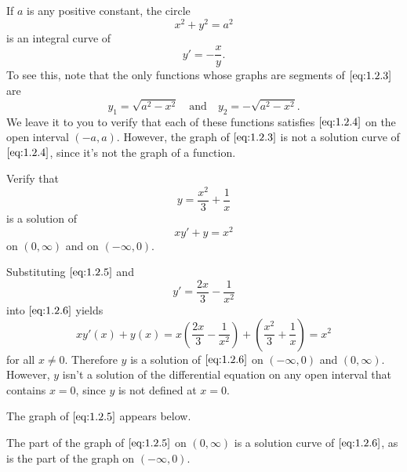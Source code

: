 \documentclass{ximera}
\begin{document}
\begin{example}
\label{example:1.2.1}
If $a$ is any positive constant,  the circle
\begin{equation} \label{eq:1.2.3}
x^2+y^2=a^2
\end{equation}
is an integral curve of
\begin{equation} \label{eq:1.2.4}
y'=-\frac{x}{y}.
\end{equation}
To see this, note that the only functions whose graphs are segments of
$\eqref{eq:1.2.3}$ are
$$
y_1=\sqrt{a^2-x^2}\quad\text{and}\quad y_2=-\sqrt{a^2-x^2}.
$$
We leave it to you to verify that each of these functions satisfies
$\eqref{eq:1.2.4}$ on the open interval $(-a,a)$. However, the graph of $\eqref{eq:1.2.3}$ is
not a solution
curve of $\eqref{eq:1.2.4}$, since it's not the graph of a function.
\end{example}
 
\begin{example}\label{example:1.2.2}
Verify that
\begin{equation} \label{eq:1.2.5}
y=\frac{x^2}{3}+\frac{1}{x}
\end{equation}
is a solution of
\begin{equation} \label{eq:1.2.6}
xy'+y=x^2
\end{equation}
 on $(0,\infty)$ and on $(-\infty,0)$.
  
\begin{explanation}
Substituting $\eqref{eq:1.2.5}$ and
$$
y'=\frac{2x}{3} - \frac{1}{x^2}
$$
into $\eqref{eq:1.2.6}$  yields
$$
xy'(x)+y(x)=x \left(\frac{2x}{3} - \frac{1}{x^2}\right)+
\left(\frac{x^2}{3}+\frac{1}{x}\right)=x^2
$$
for all $x\neq 0$. Therefore $y$ is a solution of $\eqref{eq:1.2.6}$
on $(-\infty,0)$ and $(0,\infty)$.
 However, $y$ isn't  a solution of the differential
equation on any open interval that contains $x=0$, since  $y$ is
not defined at  $x=0$.
 
The graph of $\eqref{eq:1.2.5}$ appears below.
 
 
The part of the graph of $\eqref{eq:1.2.5}$ on $(0,\infty)$ is a solution curve of
$\eqref{eq:1.2.6}$, as is the part of the graph on $(-\infty,0)$.
\end{explanation}
\end{example}
 
\end{document}
